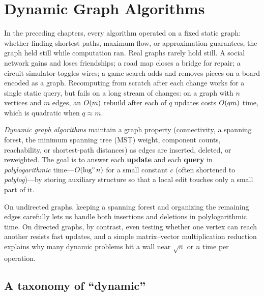 \chapter{Dynamic Graph Algorithms}
\label{ch:dynamic}

In the preceding chapters, every algorithm operated on a fixed static graph: whether finding
shortest paths, maximum flow, or approximation guarantees, the graph held still while computation ran.
Real graphs rarely hold still. A social network gains and loses friendships; a road map closes a
bridge for repair; a circuit simulator toggles wires; a game search adds and removes pieces on
a board encoded as a graph. Recomputing from scratch after each change works for a single static query,
but fails on a long stream of changes: on a graph with $n$ vertices and $m$ edges, an $O(m)$ rebuild
after each of $q$ updates costs $O(qm)$ time, which is quadratic when $q\approx m$.

\emph{Dynamic graph algorithms} maintain a graph property (connectivity, a spanning forest, the
minimum spanning tree (MST) weight, component counts, reachability, or shortest-path distances) as
edges are inserted, deleted, or reweighted. The goal is to answer each \textbf{update} and each
\textbf{query} in \emph{polylogarithmic} time---$O(\log^c n)$ for a small constant $c$ (often
shortened to \emph{polylog})---by storing auxiliary structure so that a local edit touches only a
small part of it.

On undirected graphs, keeping a spanning forest and organizing the remaining edges carefully lets us
handle both insertions and deletions in polylogarithmic time. On directed graphs, by contrast, even
testing whether one vertex can reach another resists fast updates, and a simple matrix--vector
multiplication reduction explains why many dynamic problems hit a wall near $\sqrt{n}$ or $n$ time per
operation.

\chapterline

\section{A taxonomy of ``dynamic''}
\label{ch39:taxonomy}

